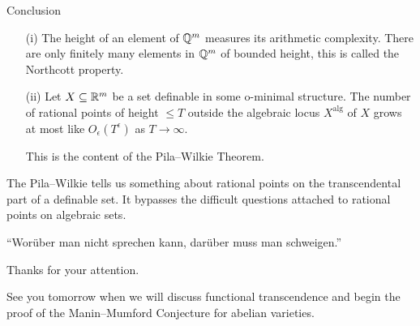 \documentclass{beamer}
\begin{document}
\begin{frame}{Conclusion}
  \begin{enumerate}
  \item [(i)]  The height of an element of ${\mathbb{Q}}^m$ measures its arithmetic
    complexity.
    There are only finitely many elements in ${\mathbb{Q}}^m$ of bounded
    height, this is called the Northcott property.
    
  \item[(ii)] Let $X\subseteq{\mathbb{R}}^m$ be a set definable in some o-minimal
    structure.
    The number of rational points of height $\le T$  outside the
    \alert{algebraic locus} $X^{\mathrm{alg}}$ of $X$ grows at most
    like $O_\epsilon(T^{\epsilon})$ as $T\rightarrow\infty$.
    
    This is the content of the Pila--Wilkie Theorem.
  \end{enumerate}

  
  The Pila--Wilkie tells us something about rational points on the
  \alert{transcendental} part of a definable set.
  It bypasses the difficult questions attached to
  rational points on \alert{algebraic} sets.

  \bigskip
  \begin{displayquote}
    ``Worüber man nicht sprechen kann, darüber muss man schweigen.''
  \end{displayquote}
\end{frame}


\begin{frame}
  \begin{center}
    Thanks for your attention.

    See you tomorrow when we will discuss functional transcendence
    and begin the proof of the Manin--Mumford Conjecture for
    abelian varieties. 
  \end{center}
\end{frame}
\end{document}
